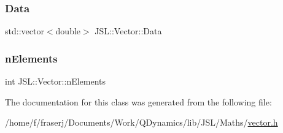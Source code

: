 \subsubsection{\texorpdfstring{Data}{Data}}
{\footnotesize\ttfamily std\+::vector$<$double$>$ J\+S\+L\+::\+Vector\+::\+Data\hspace{0.3cm}{\ttfamily [protected]}}

\mbox{\label{classJSL_1_1Vector_a84eb32f5917a770c895e106834a6c05d}} 
\subsubsection{\texorpdfstring{n\+Elements}{nElements}}
{\footnotesize\ttfamily int J\+S\+L\+::\+Vector\+::n\+Elements\hspace{0.3cm}{\ttfamily [protected]}}



The documentation for this class was generated from the following file\+:\begin{DoxyCompactItemize}
\item 
/home/f/fraserj/\+Documents/\+Work/\+Q\+Dynamics/lib/\+J\+S\+L/\+Maths/\hyperlink{vector_8h}{vector.\+h}\end{DoxyCompactItemize}
